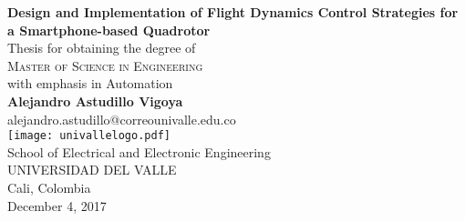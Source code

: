 \begin{titlepage}
\begin{center}
 {\LARGE\bfseries Design and Implementation of Flight Dynamics Control Strategies for a Smartphone-based Quadrotor\\}
 \vspace{2.5cm}
{Thesis for obtaining the degree of} \\[2cm]
\textsc{\Large{{Master of Science in Engineering}}} \\[5pt]
{\large  with emphasis in Automation} \\[2pt]
 \vfill
 \vspace{0.5cm}
 \vspace{1.5cm}
 {\Large\bfseries Alejandro Astudillo Vigoya}\\[5pt]
 alejandro.astudillo@correounivalle.edu.co\\[14pt]
 \vspace{1.5cm}
\texttt{[image: univallelogo.pdf]}
\\[15pt]
{School of Electrical and Electronic Engineering}\\[5pt]
{UNIVERSIDAD DEL VALLE}\\[5pt]
{Cali, Colombia}\\
 \vfill
 \vspace{0.5cm}
{December 4, 2017}

\end{center}
\end{titlepage}

\setcounter{page}{2} 

\newpage
\thispagestyle{empty}
\mbox{}


